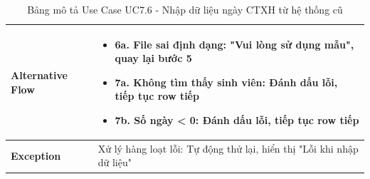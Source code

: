 \begin{table}[H]
\begin{tabular}{|m{}|m{}|}
    \textbf{Alternative Flow} 
    & \begin{itemize}
        \item \textbf{6a.} File sai định dạng: "Vui lòng sử dụng mẫu", quay lại bước 5
        \item \textbf{7a.} Không tìm thấy sinh viên: Đánh dấu lỗi, tiếp tục row tiếp
        \item \textbf{7b.} Số ngày < 0: Đánh dấu lỗi, tiếp tục row tiếp
    \end{itemize}
    \\ \hline

    \textbf{Exception} 
    & Xử lý hàng loạt lỗi: Tự động thử lại, hiển thị "Lỗi khi nhập dữ liệu"
    \\ \hline
    \end{tabular}
    \caption{Bảng mô tả Use Case UC7.6 - Nhập dữ liệu ngày CTXH từ hệ thống cũ}
    \end{table}
